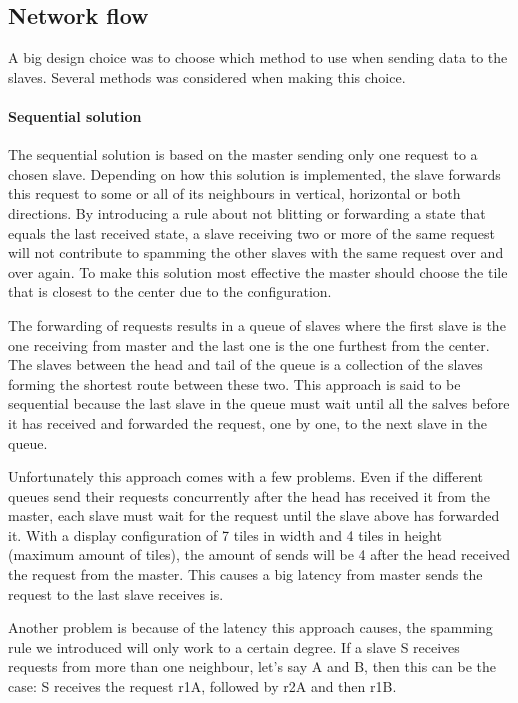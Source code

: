 \documentclass[12pt, a4paper, oneside]{article}
\begin{document}
\subsection{Network flow}
A big design choice was to choose which method to use when sending data to the slaves. Several methods was considered when making this choice. 

\paragraph{Sequential solution}
The sequential solution is based on the master sending only one request to a chosen slave. Depending on how this solution is implemented, the slave forwards this request to some or all of its neighbours in vertical, horizontal or both directions. By introducing a rule about not blitting or forwarding a state that equals the last received state, a slave receiving two or more of the same request will not contribute to spamming the other slaves with the same request over and over again. To make this solution most effective the master should choose the tile that is closest to the center due to the configuration.

The forwarding of requests results in a queue of slaves where the first slave is the one receiving from master and the last one is the one furthest from the center. The slaves between the head and tail of the queue is a collection of the slaves forming the shortest route between these two. 
This approach is said to be sequential because the last slave in the queue must wait until all the salves before it has received and forwarded the request, one by one, to the next slave in the queue.

Unfortunately this approach comes with a few problems. Even if the different queues send their requests concurrently after the head has received it from the master, each slave must wait for the request until the slave above has forwarded it. With a display configuration of 7 tiles in width and 4 tiles in height (maximum amount of tiles), the amount of sends will be 4 after the head received the request from the master. This causes a big latency from master sends the request to the last slave receives is. 

Another problem is because of the latency this approach causes, the spamming rule we introduced will only work to a certain degree. If a slave S receives requests from more than one neighbour, let's say A and B, then this can be the case:
S receives the request r1A, followed by r2A and then r1B.
\end{document}
